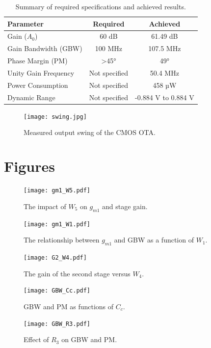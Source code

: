 \documentclass[12pt,a4paper]{article}
\begin{document}
\begin{table}[H]
    \centering
    \begin{tabular}{@{}lcc@{}}
        \toprule
        \textbf{Parameter}       & \textbf{Required} & \textbf{Achieved}       \\ 
        \midrule
        Gain ($A_0$)             & 60 dB             & 61.49 dB               \\ 
        Gain Bandwidth (GBW)     & 100 MHz           & 107.5 MHz              \\ 
        Phase Margin (PM)        & >45°              & 49°                    \\ 
        Unity Gain Frequency     & Not specified     & 50.4 MHz               \\ 
        Power Consumption        & Not specified     & 458 µW                 \\ 
        Dynamic Range            & Not specified     & -0.884 V to 0.884 V    \\ 
        \bottomrule
    \end{tabular}
    \caption{Summary of required specifications and achieved results.}
    \label{tab:summary_results}
\end{table}

\begin{figure}[H]
    \centering
    \texttt{[image: swing.jpg]}
    \caption{Measured output swing of the CMOS OTA.}
    \label{fig:swing}
\end{figure}


\section*{Figures}
\begin{figure}[H]
    \centering
    \texttt{[image: gm1\_W5.pdf]}
    \caption{The impact of $W_5$ on $g_{m1}$ and stage gain.}
    \label{fig:gm1_w5}
\end{figure}

\begin{figure}[H]
    \centering
    \texttt{[image: gm1\_W1.pdf]}
    \caption{The relationship between $g_{m1}$ and GBW as a function of $W_1$.}
    \label{fig:gm1_w1}
\end{figure}

\begin{figure}[H]
    \centering
    \texttt{[image: G2\_W4.pdf]}
    \caption{The gain of the second stage versus $W_4$.}
    \label{fig:G2_W4}
\end{figure}

\begin{figure}[H]
    \centering
    \texttt{[image: GBW\_Cc.pdf]}
    \caption{GBW and PM as functions of $C_c$.}
    \label{fig:GBW_Cc}
\end{figure}

\begin{figure}[H]
    \centering
    \texttt{[image: GBW\_R3.pdf]}
    \caption{Effect of $R_3$ on GBW and PM.}
    \label{fig:GBW_R3}
\end{figure}
\end{document}
